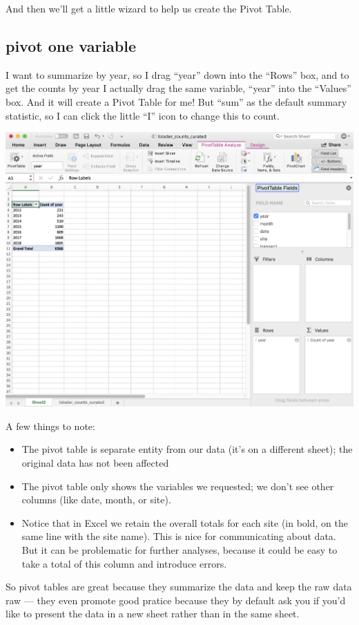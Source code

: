 \documentclass[]{book}
\providecommand{\tightlist}{%
  \setlength{\itemsep}{0pt}\setlength{\parskip}{0pt}}
\begin{document}
And then we'll get a little wizard to help us create the Pivot Table.

\hypertarget{pivot-one-variable}{%
\subsection{pivot one variable}\label{pivot-one-variable}}

I want to summarize by year, so I drag ``year'' down into the ``Rows'' box, and to get the counts by year I actually drag the same variable, ``year'' into the ``Values'' box. And it will create a Pivot Table for me! But ``sum'' as the default summary statistic, so I can click the little ``I'' icon to change this to count.

\includegraphics[width=0.6\linewidth]{img/pivot-table-count-year}

A few things to note:

\begin{itemize}
\tightlist
\item
  The pivot table is separate entity from our data (it's on a different sheet); the original data has not been affected
\item
  The pivot table only shows the variables we requested; we don't see other columns (like date, month, or site).
\item
  Notice that in Excel we retain the overall totals for each site (in bold, on the same line with the site name). This is nice for communicating about data. But it can be problematic for further analyses, because it could be easy to take a total of this column and introduce errors.
\end{itemize}

So pivot tables are great because they summarize the data and keep the raw data raw --- they even promote good pratice because they by default ask you if you'd like to present the data in a new sheet rather than in the same sheet.
\end{document}
